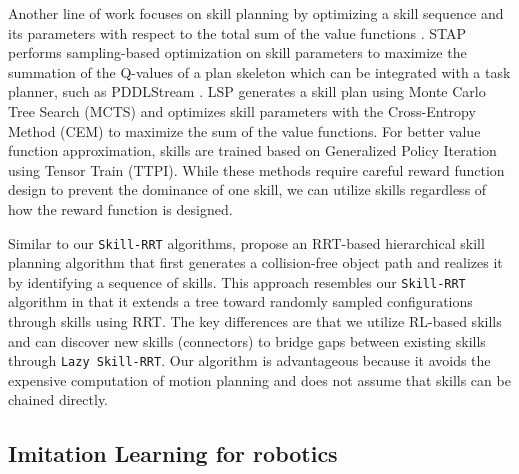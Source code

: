 Another line of work focuses on skill planning by optimizing a skill sequence and its parameters with respect to the total sum of the value functions \cite{agia2023stap, xue2024logic}. STAP \cite{agia2023stap} performs sampling-based optimization on skill parameters to maximize the summation of the Q-values of a plan skeleton which can be integrated with a task planner, such as PDDLStream \cite{garrett2020pddlstream}. LSP \cite{xue2024logic} generates a skill plan using Monte Carlo Tree Search (MCTS) \cite{browne2012survey} and optimizes skill parameters with the Cross-Entropy Method (CEM) \cite{de2005tutorial} to maximize the sum of the value functions. For better value function approximation, skills are trained based on Generalized Policy Iteration using Tensor Train (TTPI). While these methods require careful reward function design to prevent the dominance of one skill, we can utilize skills regardless of how the reward function is designed.

Similar to our \texttt{Skill-RRT} algorithms, \citet{barry2013hierarchical} propose an RRT-based hierarchical skill planning algorithm that first generates a collision-free object path and realizes it by identifying a sequence of skills. This approach resembles our \texttt{Skill-RRT} algorithm in that it extends a tree toward randomly sampled configurations through skills using RRT. The key differences are that we utilize RL-based skills and can discover new skills (connectors) to bridge gaps between existing skills through \texttt{Lazy Skill-RRT}. Our algorithm is advantageous because it avoids the expensive computation of motion planning and does not assume that skills can be chained directly.

\subsection{Imitation Learning for robotics}



